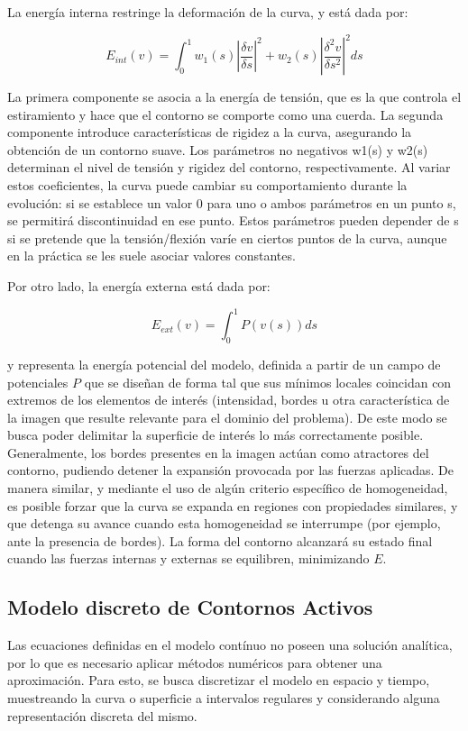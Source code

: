 La energía interna restringe la deformación de la curva, y está dada por:

$$ E_{int}(v) = \int_{0}^{1} w_{1}(s) \left| \dfrac{\delta v}{\delta s} \right|^{2} + w_{2}(s) \left|\dfrac{\delta^{2}v}{\delta s^2} \right|^{2} ds $$

La primera componente se asocia a la energía de tensión, que es la que controla el estiramiento y hace que el contorno se comporte como una cuerda. La segunda componente introduce características de rigidez a la curva, asegurando la obtención de un contorno suave. Los parámetros no negativos w1(s) y w2(s) determinan el nivel de tensión y rigidez del contorno, respectivamente. Al variar estos coeficientes, la curva puede cambiar su comportamiento durante la evolución: si se establece un valor 0 para uno o ambos parámetros en un punto s, se permitirá discontinuidad en ese punto. Estos parámetros pueden depender de s si se pretende que la tensión/flexión varíe en ciertos puntos de la curva, aunque en la práctica se les suele asociar valores constantes.

Por otro lado, la energía externa está dada por:

$$ E_{ext}(v) = \int_{0}^{1} P(v(s))ds $$

y representa la energía potencial del modelo, definida a partir de un campo de potenciales $P$ que se diseñan de forma tal que sus mínimos locales coincidan con extremos de los elementos de interés (intensidad, bordes u otra característica de la imagen que resulte relevante para el dominio del problema). De este modo se busca poder delimitar la superficie de interés lo más correctamente posible. Generalmente, los bordes presentes en la imagen actúan como atractores del contorno, pudiendo detener la expansión provocada por las fuerzas aplicadas. De manera similar, y mediante el uso de algún criterio específico de homogeneidad, es posible forzar que la curva se expanda en regiones con propiedades similares, y que detenga su avance cuando esta homogeneidad se interrumpe (por ejemplo, ante la presencia de bordes).
La forma del contorno alcanzará su estado final cuando las fuerzas internas y externas se equilibren, minimizando $E$.

\subsection{Modelo discreto de Contornos Activos}\label{section:modelo_discreto_contornos_activos}
Las ecuaciones definidas en el modelo contínuo no poseen una solución analítica, por lo que es necesario aplicar métodos numéricos para obtener una aproximación. Para esto, se busca discretizar el modelo en espacio y tiempo, muestreando la curva o superficie a intervalos regulares y considerando alguna representación discreta del mismo.

